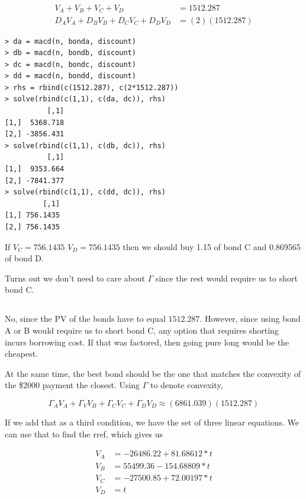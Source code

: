 \documentclass[11pt]{scrartcl}
\begin{document}
\begin{align*}
V_A + V_B + V_C + V_D &= 1512.287 \\
D_A V_A + D_BV_B + D_CV_C + D_DV_D &= (2)(1512.287)
\end{align*}

\begin{lstlisting}
> da = macd(n, bonda, discount)
> db = macd(n, bondb, discount)
> dc = macd(n, bondc, discount)
> dd = macd(n, bondd, discount)
> rhs = rbind(c(1512.287), c(2*1512.287))
> solve(rbind(c(1,1), c(da, dc)), rhs)
          [,1]
[1,]  5368.718
[2,] -3856.431
> solve(rbind(c(1,1), c(db, dc)), rhs)
          [,1]
[1,]  9353.664
[2,] -7841.377
> solve(rbind(c(1,1), c(dd, dc)), rhs)
         [,1]
[1,] 756.1435
[2,] 756.1435
\end{lstlisting}

If $V_C = 756.1435$ $V_D = 756.1435$ then we should buy 1.15 of bond C and 0.869565 of bond D.

Turns out we don't need to care about $\Gamma$ since the rest would require us to short bond C.

\subsection{}

No, since the PV of the bonds have to equal $1512.287$. However, since using bond A or B would require us to short bond C, any option that requires shorting incurs borrowing cost. If that was factored, then going pure long would be the cheapest.

At the same time, the best bond should be the one that matches the convexity of the \$2000 payment the closest. Using $\Gamma$ to denote convexity,

\[\Gamma_A V_A + \Gamma_V V_B + \Gamma_C V_C + \Gamma_D V_D \approx (6861.039)(1512.287)\]

If we add that as a third condition, we have the set of three linear equations. We can use that to find the rref, which gives us

\begin{align*}
V_A &= -26486.22 + 81.68612*t \\
V_B &= 55499.36 - 154.68809*t \\
V_C &= -27500.85 + 72.00197*t \\
V_D &= t
\end{align*}
\end{document}
